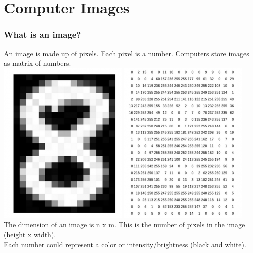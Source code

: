 \section{Computer Images}

\begin{frame}[fragile]
  \frametitle{What is an image?}
  An image is made up of pixels. Each pixel is a number. Computers
  store images as matrix of numbers.\\
  \vspace{3mm}
  \includegraphics[scale=0.4]{img/img_1}
  \includegraphics[scale=0.4]{img/img_2}\\
  \vspace{3mm}
  The dimension of an image is n x m. This is the number of pixels
  in the image (height x width).\\
  Each number could represent a color or intensity/brightness (black and white).
\end{frame}

